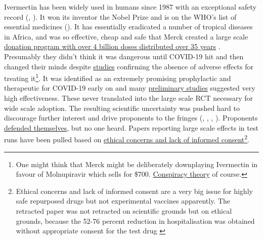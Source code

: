\documentclass[11pt,a4paper,notitlepage]{report}
\begin{document}
Ivermectin has been widely used in humans since 1987 with an exceptional safety record (\cite{Smit2016-fq}, \cite{Crump2011-ev}). It won its inventor the Nobel Prize and is on the WHO’s list of essential medicines (\cite{Crump2017-qg}). It has essentially eradicated a number of tropical diseases in Africa, and was so effective, cheap and safe that Merck created a large scale \href{https://www.merck.com/stories/mectizan/}{donation program with over 4 billion doses distributed over 35 years} \cite{merck06012021}. Presumably they didn't think it was dangerous until COVID-19 hit and then changed their minds despite \href{https://academic.oup.com/ofid/article/8/Supplement_1/S365/6450290}{studies} \cite{wentzel2021} confirming the absence of adverse effects for treating it\footnote{One might think that Merck might be deliberately downplaying Ivermectin in favour of Molnupiravir which sells  for \$700. \href{https://www.bloomberg.com/news/articles/2021-12-08/merck-s-mrk-covid-pill-must-first-overcome-anti-vax-ivermectin-misinformation}{Conspiracy theory} of course.}. It was identified as an extremely promising prophylactic and therapeutic for COVID-19 early on and many \href{https://c19ivermectin.com/}{preliminary studies} suggested very high effectiveness. These never translated into the large scale RCT necessary for wide scale adoption. The resulting scientific uncertainty was pushed hard to discourage further interest and drive proponents to the fringes (\cite{bbc06102021}, \cite{guardian13092021}, \cite{guardian24092021}, \cite{guardian24092021b}). Proponents \href{https://bird-group.org/the-bbcs-recent-article-false-science-is-disintegrating-under-scrutiny/}{defended themselves}, but no one heard. Papers reporting large scale effects in test runs have been pulled based on \href{https://healthpolicy-watch.news/mexico-city-officials-in-row-over-misleading-paper-to-justify-its-ivermectin-drive/}{ethical concerns and lack of informed consent}\footnote{Ethical concerns and lack of informed consent are a very big issue for highly safe repurposed drugs but not experimental vaccines apparently. The retracted paper was not retracted on scientific grounds but on ethical grounds, because the 52-76 percent reduction in hospitalisation was obtained without appropriate consent for the test drug \cite{bmj22022022}}. 
\end{document}
